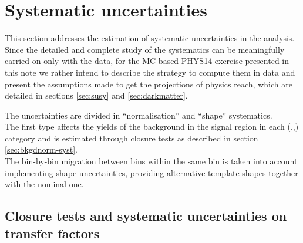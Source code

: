 \section{Systematic uncertainties}
\label{sec:systematics}
This section addresses the estimation of systematic uncertainties in the analysis.
Since the detailed and complete study of the systematics can be meaningfully carried on only with the data, 
for the MC-based PHYS14 exercise presented in this note we rather intend to describe the strategy to compute them 
in data and present the assumptions made to get the projections of physics reach, which are detailed in sections \ref{sec:susy} and \ref{sec:darkmatter}. 

The uncertainties are divided in ``normalisation'' and ``shape'' systematics. \\
The first type affects the yields of the background in the signal region in each (\nb,\njet,\HT) 
category and is estimated through closure tests as described in section \ref{sec:bkgdnorm-syst}. \\
The bin-by-bin migration between \mht bins within the same \HT bin is taken into account implementing 
shape uncertainties, providing alternative template \mht shapes together with the nominal one.

%

\subsection{Closure tests and systematic uncertainties on transfer factors\label{sec:bkgdnorm-syst}}

